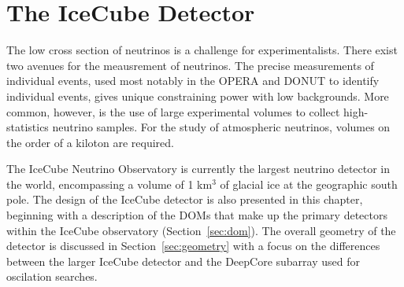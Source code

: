 \chapter{The IceCube Detector}
The low cross section of neutrinos is a challenge for experimentalists.
There exist two avenues for the meausrement of neutrinos.
The precise measurements of individual events, used most notably in the OPERA \cite{Description-OPERA} and DONUT \cite{DONUT-2001} to identify individual events, gives unique constraining power with low backgrounds.
More common, however, is the use of large experimental volumes to collect high-statistics neutrino samples.
For the study of atmospheric neutrinos, volumes on the order of a kiloton are required. 

The IceCube Neutrino Observatory is currently the largest neutrino detector in the world, encompassing a volume of 1 km$^3$ of glacial ice at the geographic south pole.
The design of the IceCube detector is also presented in this chapter, beginning with a description of the DOMs that make up the primary detectors within the IceCube observatory (Section~\ref{sec:dom}).
The overall geometry of the detector is discussed in Section~\ref{sec:geometry} with a focus on the differences between the larger IceCube detector and the DeepCore subarray used for oscilation searches.

\label{sec:dom}


\label{sec:geometry}


\label{sec:ice}


